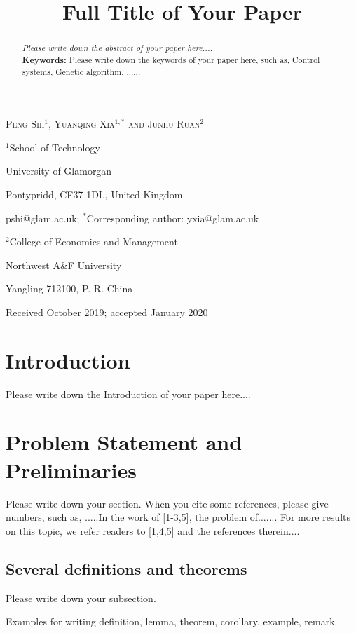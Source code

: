 \documentclass[12pt,a4paper]{icicel}
\title[ICIC Express Letters, Vol.14, No.7, 2020]
      {Full Title of Your Paper}
\author[P. Shi, Y. Xia and J. Ruan]{}
\begin{document}
\maketitle

\centerline{\scshape  Peng Shi$^1$, Yuanqing Xia$^{1,\ast}$ and Junhu Ruan$^2$}
 \medskip
{\footnotesize
\centerline{$^1$School of Technology}
\centerline{University of Glamorgan}
\centerline{Pontypridd, CF37 1DL, United Kingdom}
\centerline{pshi@glam.ac.uk; $^\ast$Corresponding author: yxia@glam.ac.uk} }
\medskip

{\footnotesize
\centerline{$^2$College of Economics and Management}
\centerline{Northwest A\&F University}
\centerline{Yangling 712100, P. R. China}}
\medskip

\centerline{Received October 2019; accepted January 2020}


\medskip


\begin{abstract}

{\em Please write down the abstract of your paper here....}\\
{\bf Keywords:} Please write down the keywords of your paper here, such as, Control systems, Genetic algorithm, ......

\end{abstract}

\section{Introduction}

Please write down the Introduction of your paper here....

\section{Problem Statement and Preliminaries}

Please write down your section. When you cite some references,
please give numbers, such as, .....In the work of [1-3,5], the problem of.......
For more results on this topic, we refer readers to [1,4,5] and the references therein....

\subsection{Several definitions and theorems}
Please write down your subsection.

Examples for writing definition, lemma, theorem, corollary, example, remark.
\end{document}
